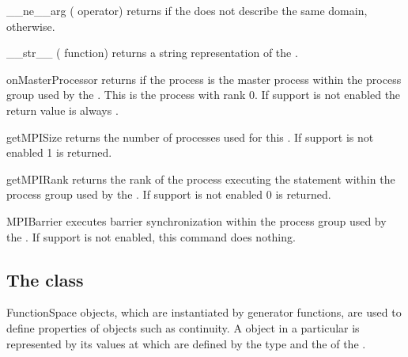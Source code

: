 %
\begin{methoddesc}[Domain]{__ne__}{arg}
    (\PYTHON \var{!=} operator) returns \True if the \Domain {} does
    not describe the same domain, \False otherwise.
\end{methoddesc}
%
\begin{methoddesc}[Domain]{__str__}{}
    (\PYTHON {} function) returns a string representation of the
    \Domain.
\end{methoddesc}
%
\begin{methoddesc}[Domain]{onMasterProcessor}{}
    returns \True if the process is the master process within the \MPI
    process group used by the \Domain. This is the process with rank 0.
    If \MPI support is not enabled the return value is always \True.
\end{methoddesc}
%
\begin{methoddesc}[Domain]{getMPISize}{}
    returns the number of \MPI processes used for this \Domain. If \MPI
    support is not enabled 1 is returned.
\end{methoddesc}
%
\begin{methoddesc}[Domain]{getMPIRank}{}
    returns the rank of the process executing the statement within the
    \MPI process group used by the \Domain. If \MPI support is not enabled
    0 is returned.
\end{methoddesc}
%
\begin{methoddesc}[Domain]{MPIBarrier}{}
    executes barrier synchronization within the \MPI process group used by
    the \Domain. If \MPI support is not enabled, this command does nothing.
\end{methoddesc}

\subsection{The \FunctionSpace class}
\begin{classdesc}{FunctionSpace}{}
\FunctionSpace objects, which are instantiated by generator functions, are
used to define properties of \Data objects such as continuity.
A \Data object in a particular \FunctionSpace is represented by its values at
\DataSamplePoints which are defined by the type and the \Domain of the \FunctionSpace.
\end{classdesc}

